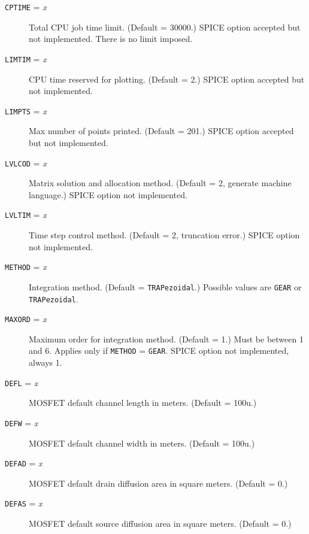 \begin{description}
\item[{\tt CPTIME} = {\it x}] Total CPU job time limit.
(Default = 30000.)  SPICE option accepted but not implemented.
There is no limit imposed.

\item[{\tt LIMTIM} = {\it x}] CPU time reserved for plotting.
(Default = 2.)  SPICE option accepted but not implemented.

\item[{\tt LIMPTS} = {\it x}] Max number of points printed.
(Default = 201.)  SPICE option accepted but not implemented.

\item[{\tt LVLCOD} = {\it x}] Matrix solution and allocation
method.  (Default = 2, generate machine language.)  SPICE
option not implemented.

\item[{\tt LVLTIM} = {\it x}] Time step control method.
(Default = 2, truncation error.)  SPICE option not implemented.

\item[{\tt METHOD} = {\it x}] Integration method.  (Default =
{\tt TRAPezoidal}.)  Possible values are {\tt GEAR} or {\tt
TRAPezoidal}.

\item[{\tt MAXORD} = {\it x}] Maximum order for integration
method.  (Default = 1.)  Must be between 1 and 6.  Applies only
if {\tt METHOD} = {\tt GEAR}.  SPICE option not implemented, always 1.

\item[{\tt DEFL} = {\it x}] MOSFET default channel length in 
meters.  (Default = 100u.)

\item[{\tt DEFW} = {\it x}]  MOSFET default channel width in 
meters.  (Default = 100u.)

\item[{\tt DEFAD} = {\it x}] MOSFET default drain diffusion area
in square meters.  (Default = 0.)

\item[{\tt DEFAS} = {\it x}]  MOSFET default source diffusion area
in square meters.  (Default = 0.)


\end{description}
